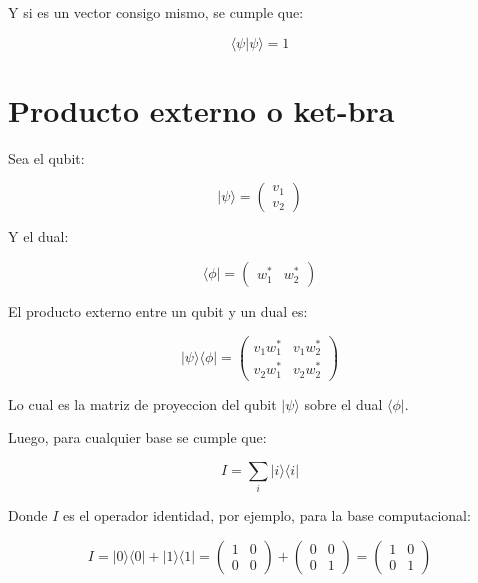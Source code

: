 \documentclass[11pt]{article}
\begin{document}
Y si es un vector consigo mismo, se cumple que:

\begin{equation}
    \langle \psi | \psi \rangle = 1
\end{equation}

\section{Producto externo o ket-bra}

Sea el qubit:

\begin{equation}
    |\psi\rangle = \begin{pmatrix} v_1 \\ v_2 \end{pmatrix}
\end{equation}

Y el dual:

\begin{equation}
    \langle \phi | = \begin{pmatrix} w_1^* & w_2^* \end{pmatrix}
\end{equation}

El producto externo entre un qubit y un dual es:

\begin{equation}
    |\psi\rangle \langle \phi | = \begin{pmatrix} v_1 w_1^* & v_1 w_2^* \\ v_2 w_1^* & v_2 w_2^* \end{pmatrix}
\end{equation}

Lo cual es la matriz de proyeccion del qubit $|\psi\rangle$ sobre el dual $\langle \phi |$.

Luego, para cualquier base se cumple que:

\begin{equation}
    I = \sum_{i} |i\rangle \langle i |
\end{equation}

Donde $I$ es el operador identidad, por ejemplo, para la base computacional:

\begin{equation}
    I = |0\rangle \langle 0| + |1\rangle \langle 1| = \begin{pmatrix} 1 & 0 \\ 0 & 0 \end{pmatrix} + \begin{pmatrix} 0 & 0 \\ 0 & 1 \end{pmatrix} = \begin{pmatrix} 1 & 0 \\ 0 & 1 \end{pmatrix}
\end{equation}
\end{document}
